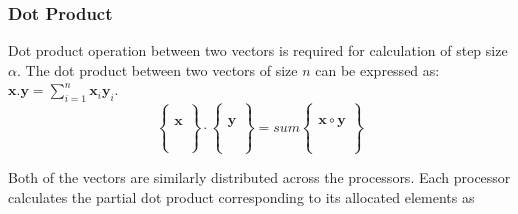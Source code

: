 \documentclass[sigplan,screen]{acmart}
\begin{document}
\subsubsection{Dot Product}
Dot product operation between two vectors is required for calculation of step size $\alpha$. The dot product between two vectors of size $n$ can be expressed as: $\textbf{x}.\textbf{y}=\sum_{i=1}^{n}\textbf{x}_i\textbf{y}_i$. 
\begin{equation*}
\begin{Bmatrix}
\\
\\
\mathbf{x}\\
\\
\\
\\	
\end{Bmatrix} \cdot
\begin{Bmatrix}
\\
\\
\mathbf{y}\\
\\
\\
\\	
\end{Bmatrix}
= sum\begin{Bmatrix}
\\
\\
\mathbf{x}\circ \mathbf{y}\\
\\
\\
\\	
\end{Bmatrix}
\end{equation*}

Both of the vectors are similarly distributed across the processors. Each processor calculates the partial dot product corresponding to its allocated elements as
\end{document}
